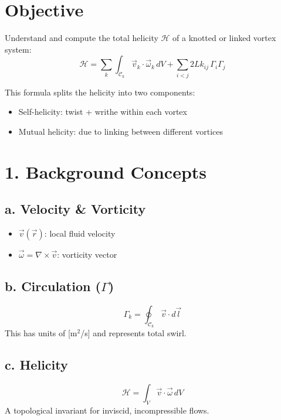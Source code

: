 \documentclass[12pt]{article}
\begin{document}
    \section*{Objective}
    Understand and compute the total helicity $\mathcal{H}$ of a knotted or linked vortex system:
    \begin{equation}
        \boxed{
            \mathcal{H} = \sum_{k} \int_{\mathcal{C}_k} \vec{v}_k \cdot \vec{\omega}_k \, dV + \sum_{i<j} 2Lk_{ij} \, \Gamma_i \Gamma_j
        }
    \end{equation}

    This formula splits the helicity into two components:
    \begin{itemize}
        \item Self-helicity: twist + writhe within each vortex
        \item Mutual helicity: due to linking between different vortices
    \end{itemize}

    \section*{1. Background Concepts}
    \subsection*{a. Velocity \& Vorticity}
    \begin{itemize}
        \item $\vec{v}(\vec{r})$: local fluid velocity
        \item $\vec{\omega} = \nabla \times \vec{v}$: vorticity vector
    \end{itemize}

    \subsection*{b. Circulation ($\Gamma$)}
    \begin{equation}
        \Gamma_k = \oint_{\mathcal{C}_k} \vec{v} \cdot d\vec{l}
    \end{equation}
    This has units of [m$^2$/s] and represents total swirl.

    \subsection*{c. Helicity}
    \begin{equation}
        \mathcal{H} = \int_V \vec{v} \cdot \vec{\omega} \, dV
    \end{equation}
    A topological invariant for inviscid, incompressible flows.
\end{document}
